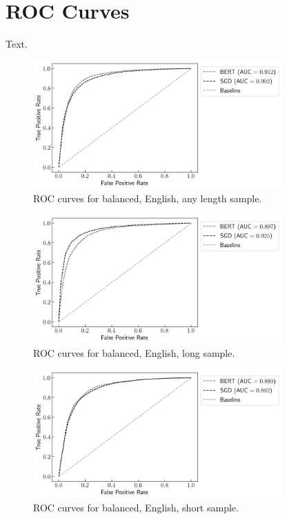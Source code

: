 \section{ROC Curves} \label{sec:A1_ROC}

Text.

\begin{figure}[!htb]
    \centering
    \includegraphics[width=0.85\textwidth]{figures/06_results/01_rfp/01_pol/02_roc/eng_eq_any.png}
    \caption{ROC curves for balanced, English, any length sample.}
    \label{fig:A1_ROC_BEA}
\end{figure}

\begin{figure}[!htb]
    \centering
    \includegraphics[width=0.85\textwidth]{figures/06_results/01_rfp/01_pol/02_roc/eng_eq_long.png}
    \caption{ROC curves for balanced, English, long sample.}
    \label{fig:A1_ROC_BEL}
\end{figure}

\begin{figure}[!htb]
    \centering
    \includegraphics[width=0.85\textwidth]{figures/06_results/01_rfp/01_pol/02_roc/eng_eq_short.png}
    \caption{ROC curves for balanced, English, short sample.}
    \label{fig:A1_ROC_BES}
\end{figure}

